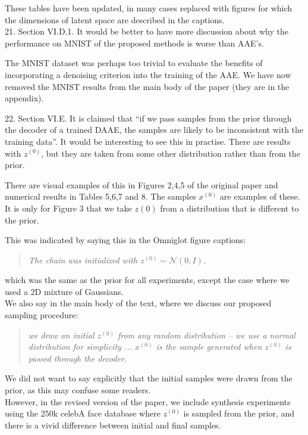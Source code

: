 \documentclass[a4paper,11pt]{article}
\begin{document}
These tables have been updated, in many cases replaced with figures for which the dimensions of latent space are described in the captions.\\

{\color{blue}
21. Section VI.D.1. It would be better to have more discussion about why the performance on MNIST of the proposed methods is worse than AAE's.\\
}

The MNIST dataset was perhaps too trivial to evaluate the benefits of incorporating a denoising criterion into the training of the AAE. We have now removed the MNIST results from the main body of the paper (they are in the appendix). 

{\color{blue}
22. Section VI.E. It is claimed that ``if we pass samples from the prior through the decoder of a trained DAAE, the samples are likely to be inconsistent with the training data''. It would be interesting to see this in practise. There are results with $z^{(0)}$, but they are taken from some other distribution rather than from the prior.\\
}

There are visual examples of this in Figures 2,4,5 of the original paper and numerical results in Tables 5,6,7 and 8. The samples $x^{(0)}$ are examples of these. It is only for Figure 3 that we take $z{(0)}$ from a distribution that is different to the prior.

This was indicated by saying this in the Omniglot figure captions:

\begin{quote}
{\it The chain was initialized with $z^{(0)} \sim \mathcal{N}(0,I)$.}
\end{quote}
which was the same as the prior for all experiments, except the case where we used a 2D mixture of Gaussians.\\

We also say in the main body of the text, where we discuss our proposed sampling procedure:
\begin{quote}
{\it we draw an initial $z^{(0)}$ from any random distribution – we use a normal distribution for simplicity ... $x^{(0)}$ is the sample generated when $z^{(0)}$ is passed through the decoder.}
\end{quote}

We did not want to say explicitly that the initial samples were drawn from the prior, as this may confuse some readers.\\

However, in the revised version of the paper, we include synthesis experiments using the 250k celebA face database where $z^{(0)}$ is sampled from the prior, and there is a vivid difference between initial and final samples.\\
\end{document}
